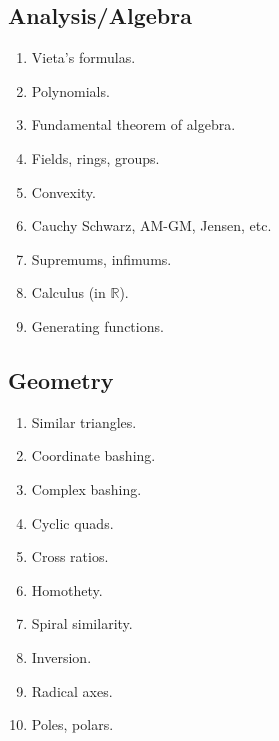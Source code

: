 \documentclass{article}
\begin{document}
\subsection*{Analysis/Algebra}
\begin{enumerate}
\item[\underline{\hspace{0.4cm}}] Vieta's formulas.
\item[\underline{\hspace{0.4cm}}] Polynomials.
\item[\underline{\hspace{0.4cm}}] Fundamental theorem of algebra.
\item[\underline{\hspace{0.4cm}}] Fields, rings, groups. 
\item[\underline{\hspace{0.4cm}}] Convexity.
\item[\underline{\hspace{0.4cm}}] Cauchy Schwarz, AM-GM, Jensen, etc.
\item[\underline{\hspace{0.4cm}}] Supremums, infimums.
\item[\underline{\hspace{0.4cm}}] Calculus (in $\mathbb{R}$).
\item[\underline{\hspace{0.4cm}}] Generating functions.
\end{enumerate}

\subsection*{Geometry}
\begin{enumerate}
\item[\underline{\hspace{0.4cm}}] Similar triangles.
\item[\underline{\hspace{0.4cm}}] Coordinate bashing.
\item[\underline{\hspace{0.4cm}}] Complex bashing.
\item[\underline{\hspace{0.4cm}}] Cyclic quads. 
\item[\underline{\hspace{0.4cm}}] Cross ratios.
\item[\underline{\hspace{0.4cm}}] Homothety.
\item[\underline{\hspace{0.4cm}}] Spiral similarity.
\item[\underline{\hspace{0.4cm}}] Inversion.
\item[\underline{\hspace{0.4cm}}] Radical axes.
\item[\underline{\hspace{0.4cm}}] Poles, polars.
\end{enumerate}
\end{document}
